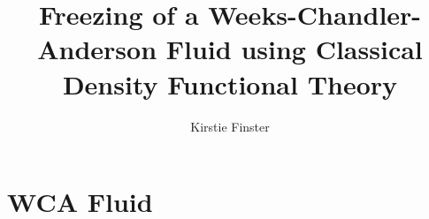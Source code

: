 \documentclass{beamer}
\title[Freezing a WCA Fluid using cDFT]{Freezing of a Weeks-Chandler-Anderson 
       Fluid using Classical Density Functional Theory}
\author{Kirstie Finster}
\begin{document}


\begin{frame}
	\titlepage
\end{frame}


\section*{WCA Fluid}
\end{document}
